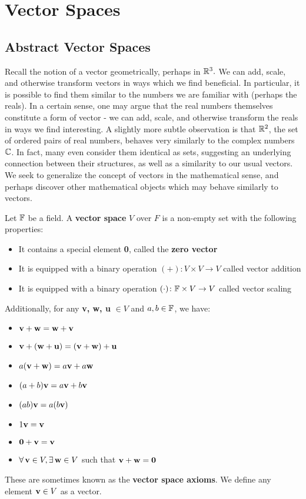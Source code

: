 \documentclass{article}
\begin{document}
\cover
\toc
\blurb


\section{Vector Spaces}
\subsection{Abstract Vector Spaces}

Recall the notion of a vector geometrically, perhaps in $ \mathbb{R}^{3}. $
We can add, scale, and otherwise transform vectors in ways which we find beneficial.
In particular, it is possible to find them similar to the numbers we are familiar with (perhaps the reals).
In a certain sense, one may argue that the real numbers themselves constitute a form of vector - we can add, scale, and otherwise transform the reals in ways we find interesting. \vsp
A slightly more subtle observation is that $ \mathbb{R}^{2} $, the set of ordered pairs of real numbers, behaves very similarly to the complex numbers $ \mathbb{C} $.
In fact, many even consider them identical as sets, suggesting an underlying connection between their structures, as well as a similarity to our usual vectors. \vsp
We seek to generalize the concept of vectors in the mathematical sense, and perhaps discover other mathematical objects which may behave similarly to vectors.

\begin{defn}
Let $ \mathbb{F} $ be a field. A \textbf{vector space} $ V $ over $ F $ is a non-empty set with the following properties:
\begin{itemize}
    \item It contains a special element \textbf{0}, called the \textbf{zero vector}
    \item It is equipped with a binary operation $ (+)\colon V \times V \rightarrow V $ called vector addition
    \item It is equipped with a binary operation $ (\cdot)\colon \mathbb{F} \times V \rightarrow V $ called vector scaling
\end{itemize}
Additionally, for any \textbf{v, w, u} $ \in V $ and $ a, b \in \mathbb{F} $, we have:
\begin{itemize}
    \item $ \mathbf{v + w} = \mathbf{w + v} $
    \item $ \mathbf{v + (w + u)} = \mathbf{(v + w) + u} $
    \item $ a(\mathbf{v + w}) = a\mathbf{v} + a\mathbf{w} $
    \item $ (a + b)\mathbf{v} = a\mathbf{v} + b\mathbf{v} $
    \item $ (ab)\mathbf{v} = a(b\mathbf{v}) $
    \item $ 1\mathbf{v} = \mathbf{v} $
    \item $ \mathbf{0 + v} = \mathbf{v} $
    \item $ \forall \, \mathbf{v} \in V, \exists \, \mathbf{w} \in V $ such that $ \mathbf{v + w = 0} $
\end{itemize}
These are sometimes known as the \textbf{vector space axioms}.
We define any element $ \mathbf{v} \in V $ as a vector.
\end{defn}
\end{document}
